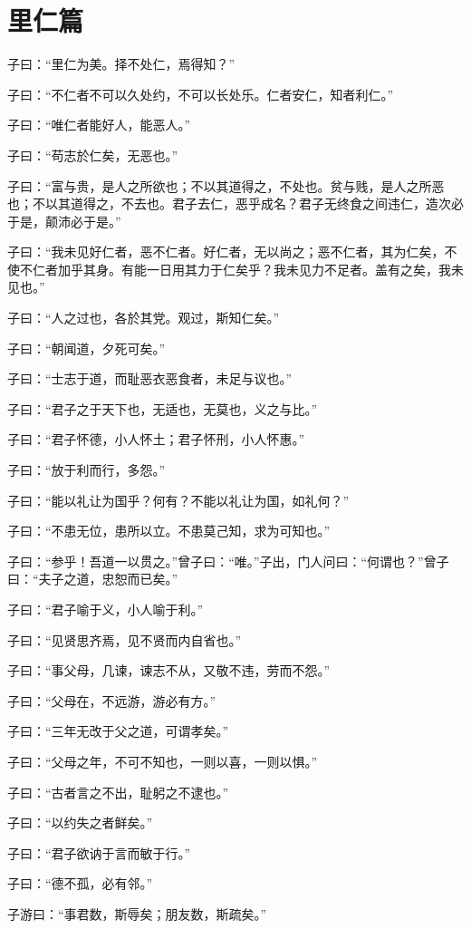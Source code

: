 \documentclass[12pt,a4paper]{ctexbook}
\begin{document}
\section{里仁篇}
子曰：“里仁为美。择不处仁，焉得知？”\par
子曰：“不仁者不可以久处约，不可以长处乐。仁者安仁，知者利仁。”\par
子曰：“唯仁者能好人，能恶人。”\par
子曰：“苟志於仁矣，无恶也。”\par
子曰：“富与贵，是人之所欲也；不以其道得之，不处也。贫与贱，是人之所恶也；不以其道得之，不去也。君子去仁，恶乎成名？君子无终食之间违仁，造次必于是，颠沛必于是。”\par
子曰：“我未见好仁者，恶不仁者。好仁者，无以尚之；恶不仁者，其为仁矣，不使不仁者加乎其身。有能一日用其力于仁矣乎？我未见力不足者。盖有之矣，我未见也。”\par
子曰：“人之过也，各於其党。观过，斯知仁矣。”\par
子曰：“朝闻道，夕死可矣。”\par
子曰：“士志于道，而耻恶衣恶食者，未足与议也。”\par
子曰：“君子之于天下也，无适也，无莫也，义之与比。”\par
子曰：“君子怀德，小人怀土；君子怀刑，小人怀惠。”\par
子曰：“放于利而行，多怨。”\par
子曰：“能以礼让为国乎？何有？不能以礼让为国，如礼何？”\par
子曰：“不患无位，患所以立。不患莫己知，求为可知也。”\par
子曰：“参乎！吾道一以贯之。”曾子曰：“唯。”子出，门人问曰：“何谓也？”曾子曰：“夫子之道，忠恕而已矣。”\par
子曰：“君子喻于义，小人喻于利。”\par
子曰：“见贤思齐焉，见不贤而内自省也。”\par
子曰：“事父母，几谏，谏志不从，又敬不违，劳而不怨。”\par
子曰：“父母在，不远游，游必有方。”\par
子曰：“三年无改于父之道，可谓孝矣。”\par
子曰：“父母之年，不可不知也，一则以喜，一则以惧。”\par
子曰：“古者言之不出，耻躬之不逮也。”\par
子曰：“以约失之者鲜矣。”\par
子曰：“君子欲讷于言而敏于行。”\par
子曰：“德不孤，必有邻。”\par
子游曰：“事君数，斯辱矣；朋友数，斯疏矣。”\par
\end{document}

